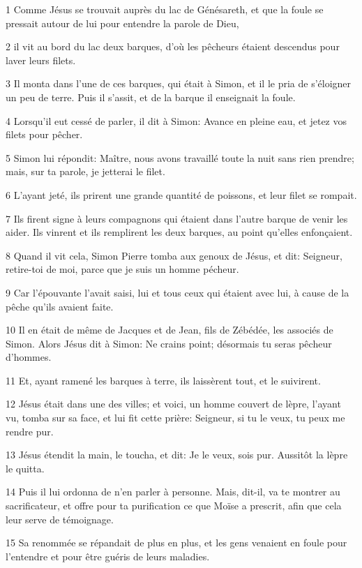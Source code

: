 \par 1 Comme Jésus se trouvait auprès du lac de Génésareth, et que la foule se pressait autour de lui pour entendre la parole de Dieu,
\par 2 il vit au bord du lac deux barques, d'où les pêcheurs étaient descendus pour laver leurs filets.
\par 3 Il monta dans l'une de ces barques, qui était à Simon, et il le pria de s'éloigner un peu de terre. Puis il s'assit, et de la barque il enseignait la foule.
\par 4 Lorsqu'il eut cessé de parler, il dit à Simon: Avance en pleine eau, et jetez vos filets pour pêcher.
\par 5 Simon lui répondit: Maître, nous avons travaillé toute la nuit sans rien prendre; mais, sur ta parole, je jetterai le filet.
\par 6 L'ayant jeté, ils prirent une grande quantité de poissons, et leur filet se rompait.
\par 7 Ils firent signe à leurs compagnons qui étaient dans l'autre barque de venir les aider. Ils vinrent et ils remplirent les deux barques, au point qu'elles enfonçaient.
\par 8 Quand il vit cela, Simon Pierre tomba aux genoux de Jésus, et dit: Seigneur, retire-toi de moi, parce que je suis un homme pécheur.
\par 9 Car l'épouvante l'avait saisi, lui et tous ceux qui étaient avec lui, à cause de la pêche qu'ils avaient faite.
\par 10 Il en était de même de Jacques et de Jean, fils de Zébédée, les associés de Simon. Alors Jésus dit à Simon: Ne crains point; désormais tu seras pêcheur d'hommes.
\par 11 Et, ayant ramené les barques à terre, ils laissèrent tout, et le suivirent.
\par 12 Jésus était dans une des villes; et voici, un homme couvert de lèpre, l'ayant vu, tomba sur sa face, et lui fit cette prière: Seigneur, si tu le veux, tu peux me rendre pur.
\par 13 Jésus étendit la main, le toucha, et dit: Je le veux, sois pur. Aussitôt la lèpre le quitta.
\par 14 Puis il lui ordonna de n'en parler à personne. Mais, dit-il, va te montrer au sacrificateur, et offre pour ta purification ce que Moïse a prescrit, afin que cela leur serve de témoignage.
\par 15 Sa renommée se répandait de plus en plus, et les gens venaient en foule pour l'entendre et pour être guéris de leurs maladies.
